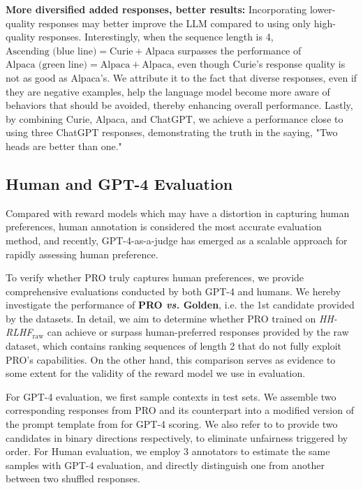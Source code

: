 \textbf{More diversified added responses, better results:} Incorporating lower-quality responses may better improve the LLM compared to using only high-quality responses. Interestingly, when the sequence length is 4, $\text{Ascending~(blue line)} = \text{Curie}+\text{Alpaca}$ surpasses the performance of $\text{Alpaca~(green line)} = \text{Alpaca} + \text{Alpaca}$, even though Curie's response quality is not as good as Alpaca's. We attribute it to the fact that diverse responses, even if they are negative examples, help the language model become more aware of behaviors that should be avoided, thereby enhancing overall performance. Lastly, by combining Curie, Alpaca, and ChatGPT, we achieve a performance close to using three ChatGPT responses, demonstrating the truth in the saying, "Two heads are better than one."

\subsection{Human and GPT-4 Evaluation}
\label{subsec:gpt4}
Compared with reward models which may have a distortion in capturing human preferences, human annotation is considered the most accurate evaluation method, and recently, GPT-4-as-a-judge has emerged as a scalable approach for rapidly assessing human preference. 

To verify whether PRO truly captures human preferences, we provide comprehensive evaluations conducted by both GPT-4 and humans. We hereby investigate the performance of \textbf{PRO \textit{vs.} Golden}, i.e. the 1st candidate provided by the datasets. In detail, we aim to determine whether PRO trained on \textit{HH-RLHF}$_{\text{raw}}$ can achieve or surpass human-preferred responses provided by the raw dataset, which contains ranking sequences of length 2 that do not fully exploit PRO's capabilities. On the other hand, this comparison serves as evidence to some extent for the validity of the reward model we use in evaluation.

For GPT-4 evaluation, we first sample contexts in test sets. We assemble two corresponding responses from PRO and its counterpart into a modified version of the prompt template from \citet{zheng2023judging} for GPT-4 scoring. We also refer to \citet{wang2023large} to provide two candidates in binary directions respectively, to eliminate unfairness triggered by order. For Human evaluation, we employ 3 annotators to estimate the same samples with GPT-4 evaluation, and directly distinguish one from another between two shuffled responses.

